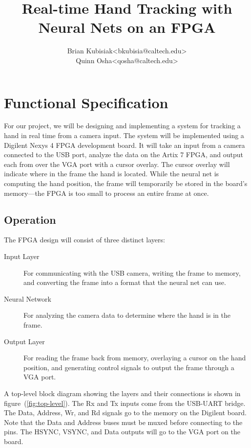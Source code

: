 \documentclass[10pt]{article}
\date{}
\title{Real-time Hand Tracking with Neural Nets on an FPGA}
\author{%
    \begin{tabular}{cc}
        Brian Kubisiak  & <bkubisia@caltech.edu> \\
        Quinn Osha      & <qosha@caltech.edu>
    \end{tabular}
}
\begin{document}
\chead{}
\rhead{\large{\today}}

\maketitle

\thispagestyle{empty}

\section{Functional Specification}
\label{sec:functional_specification}

For our project, we will be designing and implementing a system for tracking
a hand in real time from a camera input. The system will be implemented using a
Digilent Nexys 4 FPGA development board. It will take an input from a camera
connected to the USB port, analyze the data on the Artix 7 FPGA, and output each
from over the VGA port with a cursor overlay. The cursor overlay will indicate
where in the frame the hand is located. While the neural net is computing the
hand position, the frame will temporarily be stored in the board's memory---the
FPGA is too small to process an entire frame at once.

\subsection{Operation}
\label{sub:operation}

The FPGA design will consist of three distinct layers:
\begin{description}
    \item[Input Layer] For communicating with the USB camera, writing the frame
        to memory, and converting the frame into a format that the neural net
        can use.
    \item[Neural Network] For analyzing the camera data to determine where the
        hand is in the frame.
    \item[Output Layer] For reading the frame back from memory, overlaying a
        cursor on the hand position, and generating control signals to output
        the frame through a VGA port.
\end{description}

A top-level block diagram showing the layers and their connections is shown in
figure~(\ref{fig:top-level}). The Rx and Tx inputs come from the USB-UART
bridge. The Data, Address, Wr, and Rd signals go to the memory on the Digilent
board. Note that the Data and Address buses must be muxed before connecting to
the pins. The HSYNC, VSYNC, and Data outputs will go to the VGA port on the
board.
\end{document}
